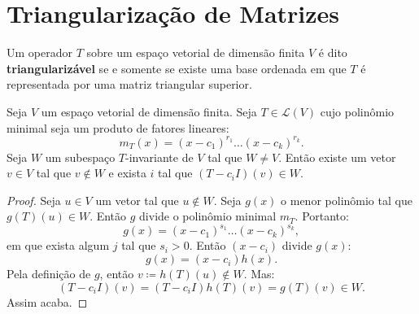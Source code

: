 \documentclass[11pt,twoside,a4paper]{book}
\begin{document}
\section{Triangularização de Matrizes}

\begin{definicao}
Um operador $T$ sobre um espaço vetorial de dimensão finita $V$ é dito \textbf{triangularizável} se e somente se existe uma base ordenada em que $T$ é representada por uma matriz triangular superior.
\end{definicao}

\begin{lema}
Seja $V$ um espaço vetorial de dimensão finita. Seja $T\in\mathcal{L}(V)$ cujo polinômio minimal seja um produto de fatores lineares:
\[
m_T(x)=(x-c_1)^{r_1}\dots(x-c_k)^{r_k}.
\] 
Seja $W$ um subespaço $T$-invariante de $V$ tal que $W\neq V$. Então existe um vetor $v\in V$ tal que $v\notin W$ e exista $i$ tal que $(T-c_iI)(v)\in W$.
\end{lema}
\begin{proof}
Seja $u\in V$ um vetor tal que $u\notin W$. Seja $g(x)$ o menor polinômio tal que $g(T)(u)\in W$. Então $g$ divide o polinômio minimal $m_T$. Portanto:
\[
g(x)=(x-c_1)^{s_1}\dots(x-c_k)^{s_k},
\]
em que exista algum $j$ tal que $s_i>0$. Então $(x-c_i)$ divide $g(x)$:
\[
g(x)=(x-c_i)h(x).
\]
Pela definição de $g$, então $v\coloneqq h(T)(u)\notin W$. Mas:
\[
(T-c_iI)(v)=(T-c_iI)h(T)(v)=g(T)(v)\in W.
\]
Assim acaba.
\end{proof}
\end{document}
